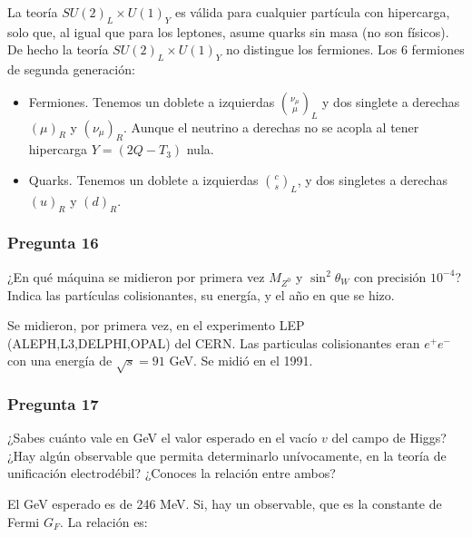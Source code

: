 La teoría $SU(2)_L \times U(1)_Y$ es válida para cualquier partícula con hipercarga, solo que, al igual que para los leptones, asume quarks sin masa (no son físicos). De hecho la teoría $SU(2)_L \times U(1)_Y$  no distingue los fermiones. Los 6 fermiones de segunda generación:

\begin{itemize}
	\item Fermiones. Tenemos un doblete a izquierdas $\binom{\nu_\mu}{\mu}_L$ y dos singlete a derechas $(\mu)_R$ y $(\nu_\mu)_R$. Aunque el neutrino a derechas no se acopla al tener hipercarga $Y=(2Q-T_3)$ nula.
	\item Quarks. Tenemos un doblete a izquierdas $\binom{c}{s}_L$, y dos singletes a derechas $(u)_R$ y $(d)_R$.
\end{itemize}

\vspace*{2em}

\begin{Enunciado}
	\subsubsection*{Pregunta 16}

	¿En qué máquina se midieron por primera vez $M_{Z^0}$ y $\sin^2\theta_W$ con precisión $10^{-4}$? Indica las partículas colisionantes, su energía, y el año en que se hizo.

\end{Enunciado}

Se midieron, por primera vez, en el experimento LEP (ALEPH,L3,DELPHI,OPAL) del CERN. Las particulas colisionantes eran $e^+ e^-$ con una energía de $\sqrt{s}=91$ GeV. Se midió en el 1991.

\vspace*{2em}

\begin{Enunciado}
	\subsubsection*{Pregunta 17}

	¿Sabes cuánto vale en GeV el valor esperado en el vacío $v$ del campo de Higgs? ¿Hay algún observable que permita determinarlo unívocamente, en la teoría de unificación electrodébil? ¿Conoces la relación entre ambos?

\end{Enunciado}

El GeV esperado es de 246 MeV. Si, hay un observable, que es la constante de Fermi $G_F$. La relación es:

